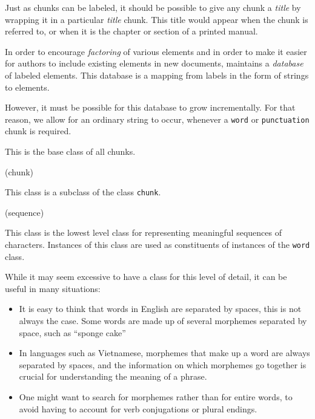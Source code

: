 Just as chunks can be labeled, it should be possible to give any chunk
a \emph{title} by wrapping it in a particular \emph{title} chunk.
This title would appear when the chunk is referred to, or when it is
the chapter or section of a printed manual.

In order to encourage \emph{factoring} of various elements and in
order to make it easier for authors to include existing elements in
new documents, \sysname{} maintains a \emph{database} of labeled
elements.  This database is a mapping from labels in the form of
\commonlisp{} strings to elements.

However, it must be possible for this database to grow incrementally.
For that reason, we allow for an ordinary string to occur, whenever a
\texttt{word} or \texttt{punctuation} chunk is required.


This is the base class of all chunks.


 {(chunk)}


This class is a subclass of the class \texttt{chunk}.


 {(sequence)}


This class is the lowest level class for representing meaningful
sequences of characters.  Instances of this class are used as
constituents of instances of the \texttt{word} class.

While it may seem excessive to have a class for this level of detail,
it can be useful in many situations:

\begin{itemize}
\item It is easy to think that words in English are separated by
  spaces, this is not always the case.  Some words are made up of
  several morphemes separated by space, such as ``sponge cake''
\item In languages such as Vietnamese, morphemes that make up a word
  are always separated by spaces, and the information on which
  morphemes go together is crucial for understanding the meaning of a
  phrase.
\item One might want to search for morphemes rather than for entire
  words, to avoid having to account for verb conjugations or plural
  endings.
\end{itemize}
